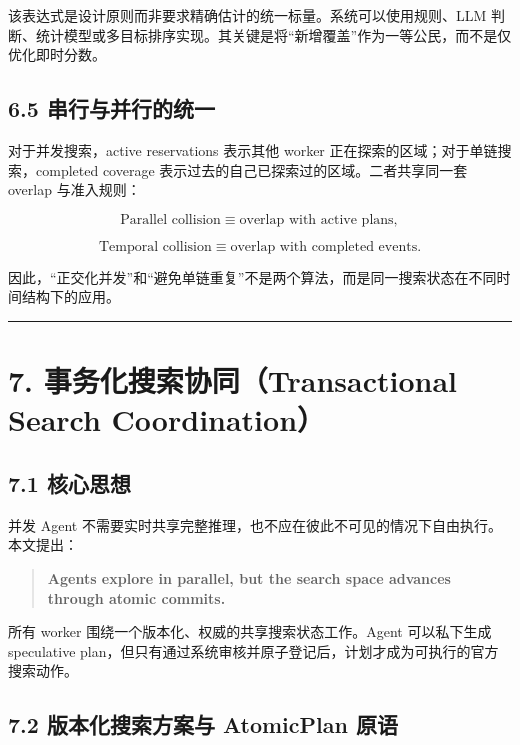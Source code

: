 \documentclass[
  11pt]{ctexart}
\begin{document}
该表达式是设计原则而非要求精确估计的统一标量。系统可以使用规则、LLM
判断、统计模型或多目标排序实现。其关键是将``新增覆盖''作为一等公民，而不是仅优化即时分数。

\subsection{6.5
串行与并行的统一}\label{ux4e32ux884cux4e0eux5e76ux884cux7684ux7edfux4e00}

对于并发搜索，active reservations 表示其他 worker
正在探索的区域；对于单链搜索，completed coverage
表示过去的自己已探索过的区域。二者共享同一套 overlap 与准入规则：

\[
\text{Parallel collision} \equiv
\text{overlap with active plans},
\]

\[
\text{Temporal collision} \equiv
\text{overlap with completed events}.
\]

因此，``正交化并发''和``避免单链重复''不是两个算法，而是同一搜索状态在不同时间结构下的应用。

\begin{center}\rule{0.5\linewidth}{0.5pt}\end{center}

\section{7. 事务化搜索协同（Transactional Search
Coordination）}\label{ux4e8bux52a1ux5316ux641cux7d22ux534fux540ctransactional-search-coordination}

\subsection{7.1 核心思想}\label{ux6838ux5fc3ux601dux60f3}

并发 Agent
不需要实时共享完整推理，也不应在彼此不可见的情况下自由执行。本文提出：

\begin{quote}
\textbf{Agents explore in parallel, but the search space advances
through atomic commits.}
\end{quote}

所有 worker 围绕一个版本化、权威的共享搜索状态工作。Agent 可以私下生成
speculative
plan，但只有通过系统审核并原子登记后，计划才成为可执行的官方搜索动作。

\subsection{7.2 版本化搜索方案与 AtomicPlan
原语}\label{ux7248ux672cux5316ux641cux7d22ux65b9ux6848ux4e0e-atomicplan-ux539fux8bed}
\end{document}
